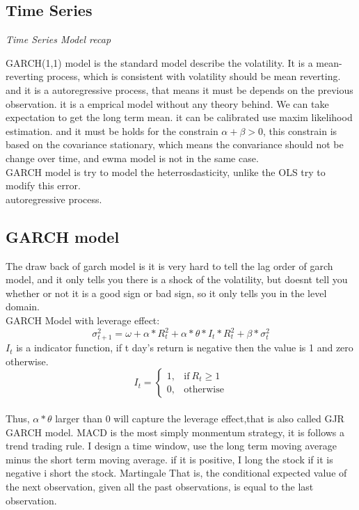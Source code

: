 \documentclass[a4paper,11pt]{article}
\begin{document}
\subsection{Time Series}
\begin{centering}
\em {Time Series Model recap\\}
\end{centering}
GARCH(1,1) model is the standard model describe the volatility. It is a mean-reverting process, which is consistent with volatility should be mean reverting. and it is a autoregressive process, that means it must be depends on the previous observation. it is a emprical model without any theory behind. We can take expectation to get the long term mean. it can be calibrated use maxim likelihood estimation. and it must be holds for the constrain $\alpha + \beta >0$, this constrain is based on the covariance stationary, which means the convariance should not be change over time, and ewma model is not in the same case.\\
GARCH model is try to model the heterrosdasticity, unlike the OLS try to modify this error. \\
autoregressive process.\\
\subsection{GARCH model}
The draw back of garch model is it is very hard to tell the lag order of garch model, and it only tells you there is a shock of the volatility, but doesnt tell you whether or not it is a good sign or bad sign, so it only tells you in the level domain.\\
GARCH Model with leverage effect:
\begin{equation}
\sigma^2_{t+1}=\omega+\alpha*R_t^2+\alpha*\theta*I_t*R_t^2+\beta*\sigma_t^2
\end{equation}
$I_t$ is a indicator function, if t day's return is negative then the value is 1 and zero otherwise.
\begin{equation}
    I_t=
    \begin{cases}
      1, & \text{if}\ R_t \geq 1 \\
      0, & \text{otherwise}
    \end{cases}
  \end{equation}\\
Thus, $\alpha*\theta$ larger than 0 will capture the leverage effect,that is also called GJR GARCH model.
MACD is the most simply monmentum strategy, it is follows a trend trading rule. I design a time window, use the long term moving average minus the short term moving average. if it is positive, I long the stock if it is negative i short the stock.
Martingale That is, the conditional expected value of the next observation, given all the past observations, is equal to the last observation. \\
\end{document}
